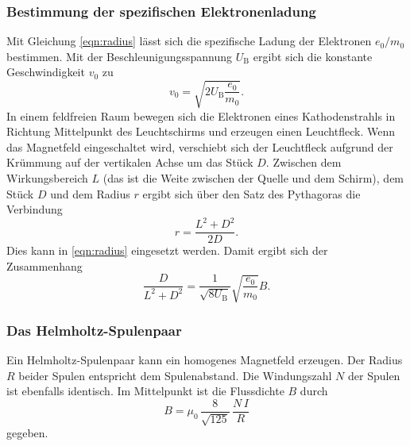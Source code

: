 \subsubsection{Bestimmung der spezifischen Elektronenladung}
Mit Gleichung \ref{eqn:radius} lässt sich die spezifische 
Ladung der Elektronen $e_\text{0}/m_\text{0}$ bestimmen. 
Mit der Beschleunigungsspannung $U_\text{B}$ ergibt sich die 
konstante Geschwindigkeit $v_\text{0}$ zu 
\begin{equation}
    v_\text{0}= \sqrt{2 U_\text{B} \frac{e_\text{0}}{m_\text{0}}}.
    \label{eqn:v0}
\end{equation}
In einem feldfreien Raum bewegen sich die Elektronen eines 
Kathodenstrahls in Richtung Mittelpunkt des Leuchtschirms und 
erzeugen einen Leuchtfleck. 
Wenn das Magnetfeld eingeschaltet wird, verschiebt sich 
der Leuchtfleck aufgrund der Krümmung auf der vertikalen Achse 
um das Stück $D$. Zwischen dem Wirkungsbereich $L$ (das ist die Weite 
zwischen der Quelle und dem Schirm), dem Stück $D$ und dem 
Radius $r$ ergibt sich über den Satz des Pythagoras die 
Verbindung
\begin{equation}
    r = \frac{L^2 + D^2}{2D}.
    \label{eqn:radius2}
\end{equation}
Dies kann in \ref{eqn:radius} eingesetzt werden.
Damit ergibt sich der Zusammenhang
\begin{equation}
    \frac{D}{L^2 + D^2}= \frac{1}{\sqrt{8 U_\text{B}}}\sqrt{\frac{e_\text{0}}{m_\text{0}}} B.
    \label{eqn:Ende}
\end{equation}

\subsubsection{Das Helmholtz-Spulenpaar}
Ein Helmholtz-Spulenpaar kann ein homogenes Magnetfeld erzeugen.
Der Radius $R$ beider Spulen entspricht dem Spulenabstand.
Die Windungszahl $N$ der Spulen ist ebenfalls identisch.
Im Mittelpunkt ist die Flussdichte $B$ durch
\begin{equation}
    B = \mu_0 \, \frac{8}{\sqrt{125}} \, \frac{N \, I}{R}
    \label{eqn:helmholtz}
\end{equation}
gegeben.